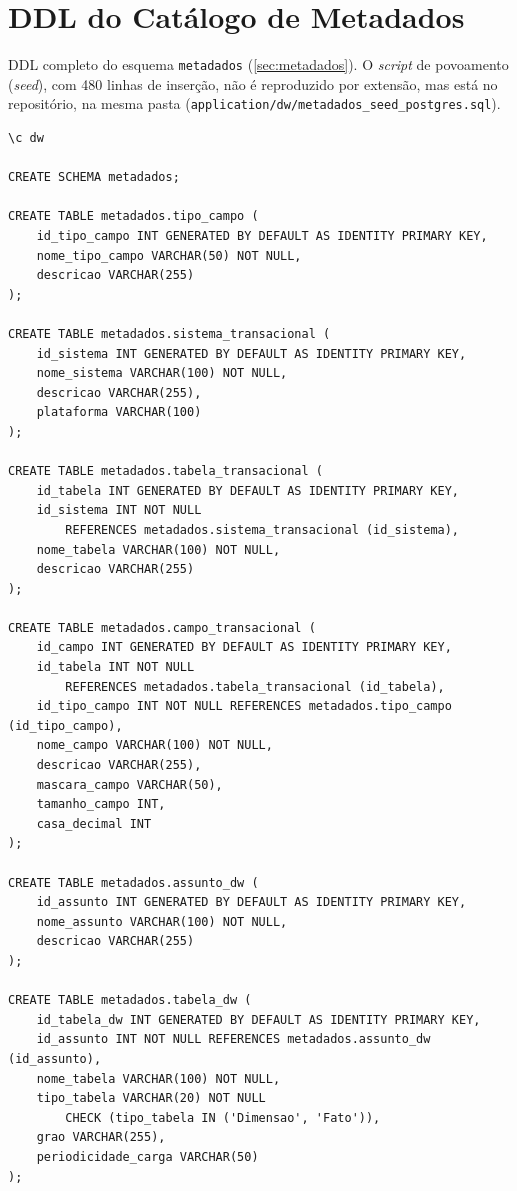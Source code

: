 \chapter{DDL do Catálogo de Metadados}
\label{apend:ddl-metadados}

DDL completo do esquema \texttt{metadados} (\autoref{sec:metadados}). O \textit{script} de povoamento (\textit{seed}), com 480 linhas de inserção, não é reproduzido por extensão, mas está no repositório, na mesma pasta (\texttt{application/dw/metadados\_seed\_postgres.sql}).

{\footnotesize
\begin{verbatim}
\c dw

CREATE SCHEMA metadados;

CREATE TABLE metadados.tipo_campo (
    id_tipo_campo INT GENERATED BY DEFAULT AS IDENTITY PRIMARY KEY,
    nome_tipo_campo VARCHAR(50) NOT NULL,
    descricao VARCHAR(255)
);

CREATE TABLE metadados.sistema_transacional (
    id_sistema INT GENERATED BY DEFAULT AS IDENTITY PRIMARY KEY,
    nome_sistema VARCHAR(100) NOT NULL,
    descricao VARCHAR(255),
    plataforma VARCHAR(100)
);

CREATE TABLE metadados.tabela_transacional (
    id_tabela INT GENERATED BY DEFAULT AS IDENTITY PRIMARY KEY,
    id_sistema INT NOT NULL
        REFERENCES metadados.sistema_transacional (id_sistema),
    nome_tabela VARCHAR(100) NOT NULL,
    descricao VARCHAR(255)
);

CREATE TABLE metadados.campo_transacional (
    id_campo INT GENERATED BY DEFAULT AS IDENTITY PRIMARY KEY,
    id_tabela INT NOT NULL
        REFERENCES metadados.tabela_transacional (id_tabela),
    id_tipo_campo INT NOT NULL REFERENCES metadados.tipo_campo (id_tipo_campo),
    nome_campo VARCHAR(100) NOT NULL,
    descricao VARCHAR(255),
    mascara_campo VARCHAR(50),
    tamanho_campo INT,
    casa_decimal INT
);

CREATE TABLE metadados.assunto_dw (
    id_assunto INT GENERATED BY DEFAULT AS IDENTITY PRIMARY KEY,
    nome_assunto VARCHAR(100) NOT NULL,
    descricao VARCHAR(255)
);

CREATE TABLE metadados.tabela_dw (
    id_tabela_dw INT GENERATED BY DEFAULT AS IDENTITY PRIMARY KEY,
    id_assunto INT NOT NULL REFERENCES metadados.assunto_dw (id_assunto),
    nome_tabela VARCHAR(100) NOT NULL,
    tipo_tabela VARCHAR(20) NOT NULL
        CHECK (tipo_tabela IN ('Dimensao', 'Fato')),
    grao VARCHAR(255),
    periodicidade_carga VARCHAR(50)
);


\end{verbatim}}
